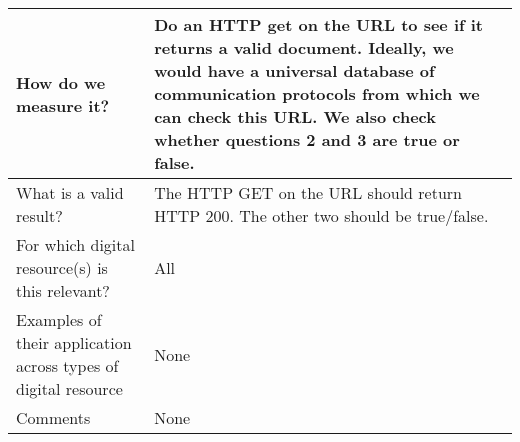 \documentclass[english]{article}
\begin{document}
\begin{longtable}{|p{5cm}|p{9cm}|}
\\



\hline
How do we measure it? &  

Do an HTTP get on the URL to see if it returns a valid document. Ideally, we would have a universal database of communication protocols from which we can check this URL. We also check whether questions 2 and 3 are true or false.  


\\



\hline
What is a valid result? &  



The HTTP GET on the URL should return HTTP 200. The other two should be true/false.


\\



\hline
For which digital resource(s) is this relevant? &  All\\



\hline
Examples of their application across types of digital resource &  None

\\



\hline

Comments & None 

\\
\hline

\end{longtable}



\newpage
\end{document}
